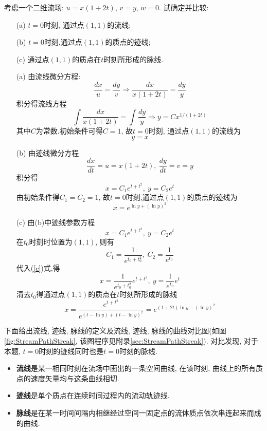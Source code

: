 \begin{problem}[问题2.3]
考虑一个二维流场: $u=x(1+2t)$, $v=y$, $w=0$. 试确定并比较:
\begin{itemize}
\item [(a)] $t=0$时刻, 通过点$(1,1)$的流线;
\item [(b)] $t=0$时刻,通过点$(1,1)$的质点的迹线;
\item [(c)] 通过点$(1,1)$的质点在$t$时刻所形成的脉线.
\end{itemize}
\end{problem}
\begin{solution}
\begin{itemize}
\item [(a)]由流线微分方程:
\[
\frac{dx}{u} = \frac{dy}{v} \Longrightarrow \frac{dx}{x(1+2t)} = \frac{dy}{y}
\]
积分得流线方程
\[
\int \frac{dx}{x(1+2t)} = \int \frac{dy}{y} \Longrightarrow y = C x^{1/(1+2t)}
\]
其中$C$为常数.初始条件可得$C=1$, 故$t=0$时刻, 通过点$(1,1)$的流线为
\[
y = x
\]

\item [(b)]由迹线微分方程
\[
\frac{dx}{dt} = u = x(1+2t), {~}  \frac{dy}{dt} = v = y
\]
积分得
\[
x =  C_1 e^{t + t^2}, {~} y = C_2 e^t
\]
由初始条件得$C_1=C_2=1$, 故$t=0$时刻,通过点$(1,1)$的质点的迹线为
\[
x = e^{\ln y + (\ln y)^2}
\]

\item [(c)]由(b)中迹线参数方程
\begin{equation}\label{c}
x =  C_1e^{t + t^2}, {~} y = C_2e^t
\end{equation}
在$t_0$时刻时位置为$(1,1)$, 则有
\[
C_1 = \frac{1}{e^{t_0+t_0^2}}, {~} C_2 =\frac{1}{e^{t_0}}
\]
代入(\ref{c})式,得
\[
x =  \frac{1}{e^{t_0+t_0^2}} e^{t + t^2}, {~} y = \frac{1}{e^{t_0}}e^t
\]
清去$t_0$得通过点$(1,1)$的质点在$t$时刻所形成的脉线
\[
x = \frac{e^{t + t^2}}{e^{(t-\ln y)+(t - \ln y)^2}} = e^{(1+2t)\ln y - (\ln y)^2}
\]
\end{itemize}
\vspace{5pt}

\begin{multicols}{2} 
下面给出流线, 迹线, 脉线的定义及流线, 迹线, 脉线的曲线对比图(如图\ref{fig:StreamPathStreak}, 该图程序见附录\ref{sec:StreamPathStreak}). 对比发现, 对于本题, $t=0$时刻的迹线同时也是$t=0$时刻的脉线.
\begin{itemize}
\item \textbf{流线}是某一相同时刻在流场中画出的一条空间曲线, 在该时刻, 曲线上的所有质点的速度矢量均与这条曲线相切.
\item \textbf{迹线}是单个质点在连续时间过程内的流动轨迹线.
\item \textbf{脉线}是在某一时间间隔内相继经过空间一固定点的流体质点依次串连起来而成的曲线.
\end{itemize}
\begin{center}

\label{fig:StreamPathStreak}
\end{center}
\end{multicols}
\end{solution}

